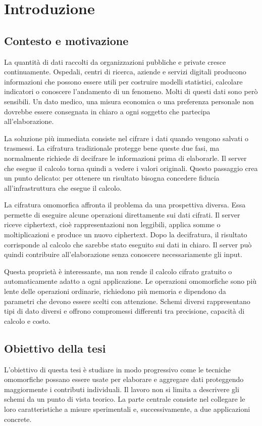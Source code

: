 \chapter{Introduzione}

\section{Contesto e motivazione}
La quantit\`a di dati raccolti da organizzazioni pubbliche e private cresce continuamente. Ospedali, centri di ricerca, aziende e servizi digitali producono informazioni che possono essere utili per costruire modelli statistici, calcolare indicatori o conoscere l'andamento di un fenomeno. Molti di questi dati sono per\`o sensibili. Un dato medico, una misura economica o una preferenza personale non dovrebbe essere consegnata in chiaro a ogni soggetto che partecipa all'elaborazione.

La soluzione pi\`u immediata consiste nel cifrare i dati quando vengono salvati o trasmessi. La cifratura tradizionale protegge bene queste due fasi, ma normalmente richiede di decifrare le informazioni prima di elaborarle. Il server che esegue il calcolo torna quindi a vedere i valori originali. Questo passaggio crea un punto delicato: per ottenere un risultato bisogna concedere fiducia all'infrastruttura che esegue il calcolo.

La cifratura omomorfica affronta il problema da una prospettiva diversa. Essa permette di eseguire alcune operazioni direttamente sui dati cifrati. Il server riceve ciphertext, cio\`e rappresentazioni non leggibili, applica somme o moltiplicazioni e produce un nuovo ciphertext. Dopo la decifratura, il risultato corrisponde al calcolo che sarebbe stato eseguito sui dati in chiaro. Il server pu\`o quindi contribuire all'elaborazione senza conoscere necessariamente gli input.

Questa propriet\`a \`e interessante, ma non rende il calcolo cifrato gratuito o automaticamente adatto a ogni applicazione. Le operazioni omomorfiche sono pi\`u lente delle operazioni ordinarie, richiedono pi\`u memoria e dipendono da parametri che devono essere scelti con attenzione. Schemi diversi rappresentano tipi di dato diversi e offrono compromessi differenti tra precisione, capacit\`a di calcolo e costo.

\section{Obiettivo della tesi}
L'obiettivo di questa tesi \`e studiare in modo progressivo come le tecniche omomorfiche possano essere usate per elaborare e aggregare dati proteggendo maggiormente i contributi individuali. Il lavoro non si limita a descrivere gli schemi da un punto di vista teorico. La parte centrale consiste nel collegare le loro caratteristiche a misure sperimentali e, successivamente, a due applicazioni concrete.

